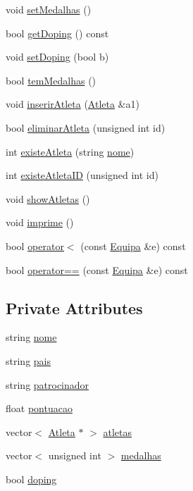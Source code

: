 \begin{DoxyCompactItemize}
void \hyperlink{class_equipa_a3993315805fb947058e50adb238c929f}{set\+Medalhas} ()
\item 
bool \hyperlink{class_equipa_a6558412092e6530d761d629cbe9c40a3}{get\+Doping} () const 
\item 
void \hyperlink{class_equipa_a13920c918f0a76970f077df3ed0267df}{set\+Doping} (bool b)
\item 
bool \hyperlink{class_equipa_a403ac4545ec90aee0f24e0af59f7f969}{tem\+Medalhas} ()
\item 
void \hyperlink{class_equipa_a67f982e822a7772f2668301db0e147eb}{inserir\+Atleta} (\hyperlink{class_atleta}{Atleta} \&a1)
\item 
bool \hyperlink{class_equipa_a12d4f1b639138a62482483e730f1c85f}{eliminar\+Atleta} (unsigned int id)
\item 
int \hyperlink{class_equipa_a9ad2d95727dfd39cf788e5c5a49b03d9}{existe\+Atleta} (string \hyperlink{class_equipa_a8373ab9d0fe95ae0c231bf2d9707e759}{nome})
\item 
int \hyperlink{class_equipa_ade9df7fbce5c76b859cb15331f7d38b9}{existe\+Atleta\+I\+D} (unsigned int id)
\item 
void \hyperlink{class_equipa_ab17ae44fbe5b5dd2d7eea4a6d752f518}{show\+Atletas} ()
\item 
void \hyperlink{class_equipa_a1329201fd3f78cf3b7c9c146578af92f}{imprime} ()
\item 
bool \hyperlink{class_equipa_afec282eb4594c7decdff4e1ee6ce1082}{operator$<$} (const \hyperlink{class_equipa}{Equipa} \&e) const 
\item 
bool \hyperlink{class_equipa_a8eec4d0cdd5d10cb0d8ede684710207a}{operator==} (const \hyperlink{class_equipa}{Equipa} \&e) const 
\end{DoxyCompactItemize}
\subsection*{Private Attributes}
\begin{DoxyCompactItemize}
\item 
string \hyperlink{class_equipa_a8373ab9d0fe95ae0c231bf2d9707e759}{nome}
\item 
string \hyperlink{class_equipa_a9972aebf308a7adcd5e23d127639311f}{pais}
\item 
string \hyperlink{class_equipa_ac9a1c45750e118888d61930c3bf4d185}{patrocinador}
\item 
float \hyperlink{class_equipa_a1b047e8ef3d73dd54b656af9dbfcf9ae}{pontuacao}
\item 
vector$<$ \hyperlink{class_atleta}{Atleta} $\ast$ $>$ \hyperlink{class_equipa_a391f6bca285bedd992f0104a17b79719}{atletas}
\item 
vector$<$ unsigned int $>$ \hyperlink{class_equipa_a80660d68792c53872f69973bfea0a5f4}{medalhas}
\item 
bool \hyperlink{class_equipa_a3fa99ed0ff8e3be35194d6c3061beb34}{doping}
\end{DoxyCompactItemize}


